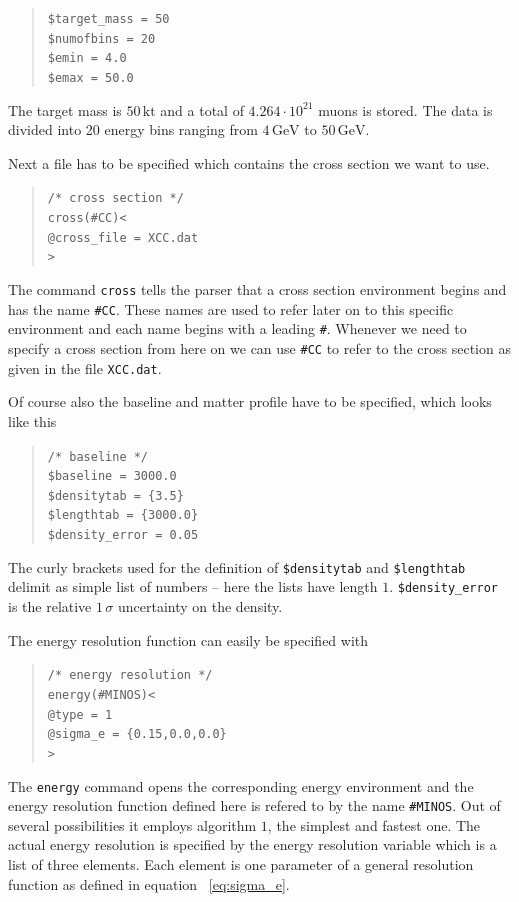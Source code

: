 \begin{quote}
{\tt \$target\_mass = 50}\\
{\tt \$numofbins = 20}\\
{\tt \$emin = 4.0}\\
{\tt \$emax = 50.0}
\end{quote}
The target mass 
is $50\,\mathrm{kt}$ and a total of $ 4.264\cdot10^{21}$
muons is stored. The data is divided into 20 energy bins ranging from
$4\,\mathrm{GeV}$ to $50\,\mathrm{GeV}$. 


Next a file has to be specified which contains the cross section we want to 
use.
\begin{quote}
{\tt /* cross section */}\\
{\tt cross(\#CC)<}\\
{\tt \tb @cross\_file = XCC.dat}\\
{\tt >}
\end{quote}
The command {\tt cross} tells the parser that a cross section environment
begins and has the name {\tt \#CC}. These names are used to refer later on
to this specific environment and each name begins with a leading {\tt \#}.
Whenever we need to specify a cross section from here on we can use {\tt \#CC}
to refer to the cross section as given in the file {\tt XCC.dat}.


Of course also the baseline and matter profile have to be specified, which
 looks like this
\begin{quote}
{\tt /* baseline */}\\
{\tt \$baseline = 3000.0}\\
{\tt \$densitytab = \{3.5\}}\\
{\tt \$lengthtab = \{3000.0\}}\\
{\tt \$density\_error = 0.05}
\end{quote}
The curly brackets used for the definition of {\tt \$densitytab} and
{\tt \$lengthtab} delimit as simple list of numbers -- here the lists
have length $1$. {\tt \$density\_error} is the relative $1\,\sigma$ uncertainty
on the density.

The energy resolution function can easily be specified with
\begin{quote}
{\tt /* energy resolution */}\\
{\tt energy(\#MINOS)<}\\
{\tt \tb @type = 1}\\
{\tt \tb @sigma\_e = \{0.15,0.0,0.0\}}\\
{\tt >}
\end{quote}
The {\tt energy} command opens the corresponding energy environment and
the energy resolution function defined here is refered to by the name 
{\tt \#MINOS}. Out of several possibilities it employs algorithm $1$,
the simplest and fastest one. The actual energy resolution is specified
by the energy resolution variable which is a list of three elements. Each 
element is one parameter of a general resolution function as defined in 
equation ~\ref{eq:sigma_e}.

